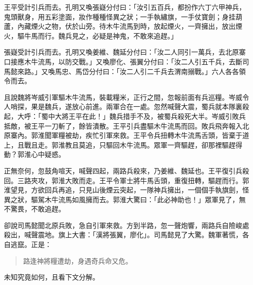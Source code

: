 王平受計引兵而去。孔明又喚張嶷分付曰：「汝引五百兵，都扮作六丁六甲神兵，鬼頭獸身，用五彩塗面，妝作種種怪異之狀；一手執繡旗，一手仗寶劍；身挂葫蘆，內藏煙火之物，伏於山旁。待木牛流馬到時，放起煙火，一齊擁出，放出煙火，驅牛馬而行。魏兵見之，必疑是神鬼，不敢來追趕。」

張嶷受計引兵而去。孔明又喚姜維、魏延分付曰：「汝二人同引一萬兵，去北原寨口接應木牛流馬，以防交戰。」又喚廖化、張翼分付曰：「汝二人引五千兵，去斷司馬懿來路。」又喚馬忠、馬岱分付曰：「汝二人引二千兵去渭南搦戰。」六人各各領令而去。

且說魏將岑威引軍驅木牛流馬，裝載糧米，正行之間，忽報前面有兵巡糧。岑威令人哨探，果是魏兵，遂放心前進。兩軍合在一處。忽然喊聲大震，蜀兵就本隊裏殺起，大呼：「蜀中大將王平在此！」魏兵措手不及，被蜀兵殺死大半。岑威引敗兵抵敵，被王平一刀斬了，餘皆潰散。王平引兵盡驅木牛流馬而回。敗兵飛奔報入北原寨內。郭淮聞軍糧被劫，疾忙引軍來救。王平令兵扭轉木牛流馬舌頭，皆棄于道上，且戰且走。郭淮教且莫追，只驅回木牛流馬。眾軍一齊驅趕，卻那裡驅趕得動？郭淮心中疑惑。

正無奈何，忽鼓角喧天，喊聲四起，兩路兵殺來，乃姜維、魏延也。王平復引兵殺回。三路夾攻，郭淮大敗而走。王平令軍士將牛馬舌頭，重復扭轉，驅趕而行。郭淮望見，方欲回兵再追，只見山後煙云突起，一隊神兵擁出，一個個手執旗劍，怪異之狀，驅駕木牛流馬如風擁而去。郭淮大驚曰：「此必神助也！」眾軍見了，無不驚畏，不敢追趕。

卻說司馬懿聞北原兵敗，急自引軍來救。方到半路，忽一聲炮響，兩路兵自險峻處殺出，喊聲震地。旗上大書：「漢將張翼，廖化」。司馬懿見了大驚。魏軍著慌，各自逃竄。正是：

\begin{quote}
路逢神將糧遭劫，身遇奇兵命又危。
\end{quote}

未知究竟如何，且看下文分解。
